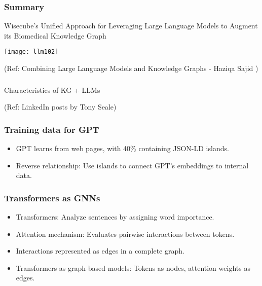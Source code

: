 \begin{frame}[fragile]\frametitle{Summary}

Wisecube's Unified Approach for Leveraging Large Language Models to Augment its Biomedical Knowledge Graph

\begin{center}
\texttt{[image: llm102]}
\end{center}	

{\tiny (Ref: Combining Large Language Models and Knowledge Graphs - Haziqa Sajid )}

\end{frame}
\begin{frame}[fragile]\frametitle{}
\begin{center}
{\Large Characteristics of KG + LLMs}

{\tiny (Ref: LinkedIn posts by Tony Seale)}
\end{center}
\end{frame}

\begin{frame}[fragile]\frametitle{Training data for GPT}

\begin{itemize}
\item GPT learns from web pages, with 40\% containing JSON-LD islands.
\item Reverse relationship: Use islands to connect GPT's embeddings to internal data.
\end{itemize}
	  
\end{frame}

\begin{frame}[fragile]\frametitle{Transformers as GNNs}

\begin{itemize}
\item Transformers: Analyze sentences by assigning word importance.
\item Attention mechanism: Evaluates pairwise interactions between tokens.
\item Interactions represented as edges in a complete graph.
\item Transformers as graph-based models: Tokens as nodes, attention weights as edges.
\end{itemize}
	  
\end{frame}


